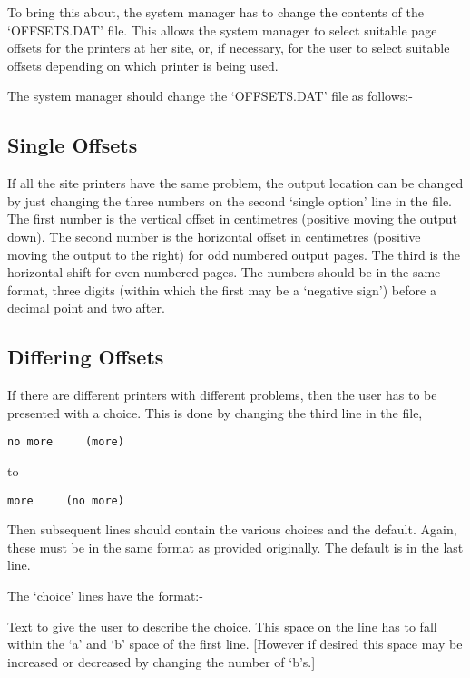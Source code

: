To bring this about, the system manager has to change the contents of the
`OFFSETS.DAT' file. This allows the system manager to select suitable page
offsets for the printers at her site, or, if necessary, for the user to
select suitable offsets depending on which printer is being used. 

The system manager should change the `OFFSETS.DAT' file as follows:- 

\subsection{Single Offsets}

If all the site printers have the same problem, the output location can be
changed by just changing the three numbers on the second `single option'
line in the file. The first number is the vertical offset in centimetres
(positive moving the output down). The second number is the horizontal
offset in centimetres (positive moving the output to the right) for odd
numbered output pages. The third is the horizontal shift for even numbered
pages. The numbers should be in the same format, three digits (within which
the first may be a `negative sign') before a decimal point and two after. 

\subsection{Differing Offsets}

If there are different printers with different problems, then the user has
to be presented with a choice. This is done by changing the third line in
the file, 

\begin{verbatim}
no more     (more)
\end{verbatim}

to

\begin{verbatim}
more     (no more)
\end{verbatim}

Then subsequent lines should contain the various choices and the default.
Again, these must be in the same format as provided originally. The default
is in the last line. 

The `choice' lines have the format:- 

Text to give the user to describe the choice. This space on the line has to
fall within the `a' and `b' space of the first line. [However if desired
this space may be increased or decreased by changing the number of `b's.] 

